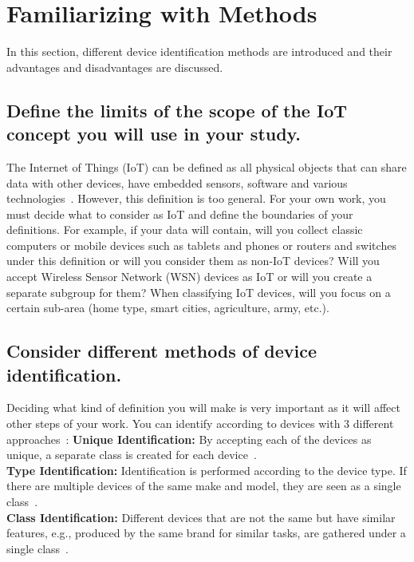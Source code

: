 \documentclass[journal]{IEEEtran}
\begin{document}
\section{Familiarizing with Methods}\label{section:Methods}

In this section, different device identification methods are introduced and their advantages and disadvantages are discussed.

\subsection{Define the limits of the scope of the IoT concept you will use in your study.}
The Internet of Things (IoT) can be defined as all physical objects that can share data with other devices, have embedded sensors, software and various technologies~\cite{hussain2020machine}. However, this definition is too general. For your own work, you must decide what to consider as IoT and define the boundaries of your definitions. For example, if your data will contain, will you collect classic computers or mobile devices such as tablets and phones or routers and switches under this definition or will you consider them as non-IoT devices? Will you accept Wireless Sensor Network (WSN) devices as IoT or will you create a separate subgroup for them? When classifying IoT devices, will you focus on a certain sub-area (home type, smart cities, agriculture, army, etc.\@).

\subsection{Consider different methods of device identification.}
Deciding what kind of definition you will make is very important as it will affect other steps of your work. You can  identify according to devices with 3 different approaches~\cite{yadav2020position}:
\textbf{Unique Identification:} By accepting each of the devices as unique, a separate class is created for each device~\cite{hamad2019iot}.\\
\textbf{Type Identification:}  Identification is performed according to the device type. If there are multiple devices of the same make and model, they are seen as a single class~\cite{miettinen2017iot}.\\
\textbf{Class Identification:}  Different devices that are not the same but have similar features, e.g., produced by the same brand for similar tasks, are gathered under a single class~\cite{nguyen2019diot,aksoy2019automated}.
\end{document}
